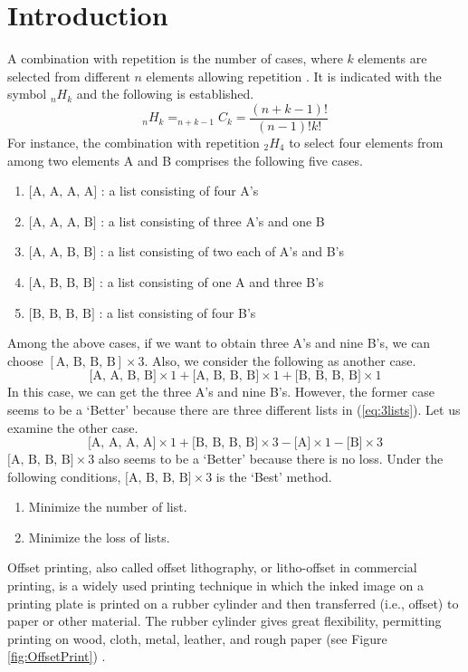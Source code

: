 \documentclass[a4paper]{amsart}
\numberwithin{equation}{section} %
\numberwithin{figure}{section} %
\numberwithin{table}{section}
\theoremstyle{plain}
\theoremstyle{definition}
\theoremstyle{plain}
\theoremstyle{plain}
\theoremstyle{plain}
\theoremstyle{plain}
\theoremstyle{plain}
\begin{document}
\section{Introduction}\label{sec:intro}
A combination with repetition is the number of cases, where $k$ elements are selected from different $n$ elements allowing repetition \cite{Brualdi2004}. 
It is indicated with the symbol $_{n}H_{k}$ and the following is established.
\begin{equation}
	_{n}H_{k} = _{n+k-1}C_{k} = \frac{(n+k-1)!}{(n-1)!k!}
\end{equation}
For instance, the combination with repetition $_{2}H_{4}$ to select four elements from among two elements A and B comprises the following five cases.
\begin{enumerate}[(1)]
	\item $\textrm{[A, A, A, A]}$ : a list consisting of four A's
	\item $\textrm{[A, A, A, B]}$ : a list consisting of three A's and one B
	\item $\textrm{[A, A, B, B]}$ : a list consisting of two each of A's and B's
	\item $\textrm{[A, B, B, B]}$ : a list consisting of one A and three B's
	\item $\textrm{[B, B, B, B]}$ : a list consisting of four B's
\end{enumerate}
Among the above cases, if we want to obtain three A's and nine B's, we can choose $[\textrm{A, B, B, B}] \times 3$. 
Also, we consider the following as another case.
\begin{equation}\label{eq:3lists}
	\textrm{[A, A, B, B]} \times 1 + \textrm{[A, B, B, B]} \times 1 + \textrm{[B, B, B, B]} \times 1
\end{equation}
In this case, we can get the three A's and nine B's. 
However, the former case seems to be a ‘Better’ because there are three different lists in (\ref{eq:3lists}). 
Let us examine the other case.
\begin{equation}
\textrm{[A, A, A, A]} \times 1 + \textrm{[B, B, B, B]} \times 3 - \textrm{[A]} \times 1 - \textrm{[B]} \times 3
\end{equation}
$\textrm{[A, B, B, B]} \times 3$ also seems to be a `Better' because there is no loss. Under the following conditions, $\textrm{[A, B, B, B]} \times 3$ is the ‘Best’ method.
\begin{enumerate}[(1)]
	\item Minimize the number of list.
	\item Minimize the loss of lists.
\end{enumerate}
Offset printing, also called offset lithography, or litho-offset in commercial printing, 
is a widely used printing technique in which the inked image on a printing plate is printed on a rubber cylinder and then transferred (i.e., offset) to paper or other material. 
The rubber cylinder gives great flexibility, permitting printing on wood, cloth, metal, leather, and rough paper (see Figure \ref{fig:OffsetPrint}) \cite{OffsetPrint}.
\end{document}
